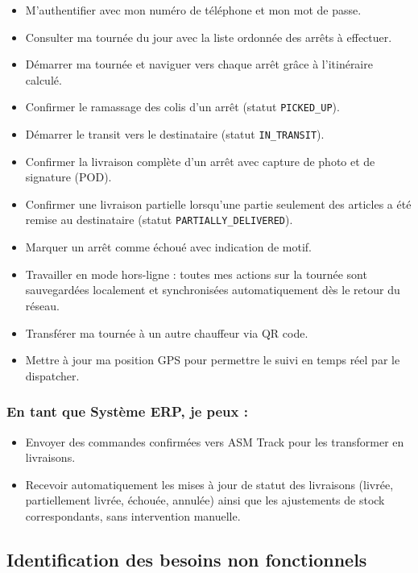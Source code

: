 \begin{itemize}
  \item M'authentifier avec mon numéro de téléphone et mon mot de passe.
  \item Consulter ma tournée du jour avec la liste ordonnée des arrêts à effectuer.
  \item Démarrer ma tournée et naviguer vers chaque arrêt grâce à l'itinéraire calculé.
  \item Confirmer le ramassage des colis d'un arrêt (statut \texttt{PICKED\_UP}).
  \item Démarrer le transit vers le destinataire (statut \texttt{IN\_TRANSIT}).
  \item Confirmer la livraison complète d'un arrêt avec capture de photo et de signature (POD).
  \item Confirmer une livraison partielle lorsqu'une partie seulement des articles
        a été remise au destinataire (statut \texttt{PARTIALLY\_DELIVERED}).
  \item Marquer un arrêt comme échoué avec indication de motif.
  \item Travailler en mode hors-ligne : toutes mes actions sur la tournée sont
        sauvegardées localement et synchronisées automatiquement dès le retour du réseau.
  \item Transférer ma tournée à un autre chauffeur via QR code.
  \item Mettre à jour ma position GPS pour permettre le suivi en temps réel par le dispatcher.
\end{itemize}

\subsubsection*{En tant que Système ERP, je peux :}

\begin{itemize}
  \item Envoyer des commandes confirmées vers ASM Track pour les transformer en livraisons.
  \item Recevoir automatiquement les mises à jour de statut des livraisons (livrée,
        partiellement livrée, échouée, annulée) ainsi que les ajustements de stock
        correspondants, sans intervention manuelle.
\end{itemize}

\subsection{Identification des besoins non fonctionnels}

